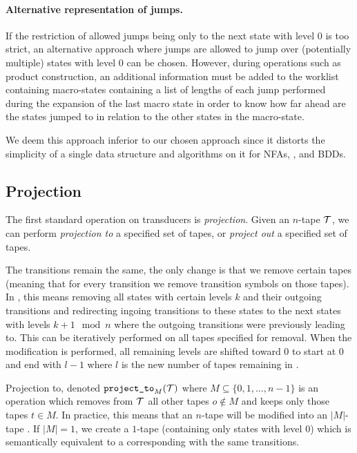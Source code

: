 \paragraph{Alternative representation of jumps.}
If the restriction of allowed jumps being only to the next state with level $0$ is too strict, an alternative approach where jumps are allowed to jump over (potentially multiple) states with level $0$ can be chosen.
However, during operations such as product construction, an additional information must be added to the worklist containing macro-states containing a list of lengths of each jump performed during the expansion of the last macro state in order to know how far ahead are the states jumped to in relation to the other states in the macro-state.

We deem this approach inferior to our chosen approach since it distorts the simplicity of a single data structure and algorithms on it for NFAs, \nfts, and BDDs.

\subsection{Projection}

The first standard operation on transducers is \emph{projection}.
Given an $n$-tape \nft $\mathcal{T}$, we can perform \emph{projection to} a specified set of tapes, or \emph{project out} a specified set of tapes.

The transitions remain the same, the only change is that we remove certain tapes (meaning that for every \nft transition we remove transition symbols on those tapes).
In \mata, this means removing all states with certain levels $k$ and their outgoing transitions and redirecting ingoing transitions to these states to the next states with levels $k + 1 \mod n$ where the outgoing transitions were previously leading to.
This can be iteratively performed on all tapes specified for removal.
When the modification is performed, all remaining levels are shifted toward $0$ to start at $0$ and end with $l - 1$ where $l$ is the new number of tapes remaining in \nft.

Projection to, denoted $\texttt{project\_to}_{M}(\mathcal{T})$ where $M \subseteq \{ 0, 1, \ldots, n - 1 \} $ is an operation which removes from $\mathcal{T}$ all other tapes $o \notin M$ and keeps only those tapes $t \in M$.
In practice, this means that an $n$-tape \nft will be modified into an $|M|$-tape \nft.
If $|M| = 1$, we create a $1$-tape \nft (containing only states with level $0$) which is semantically equivalent to a corresponding \nfa with the same transitions.

